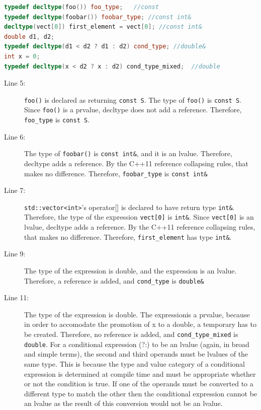 \documentclass[a4paper,11pt,twoside]{book}
\begin{document}
\begin{itemize}
\begin{lstlisting}[frame=single, language=c++]
typedef decltype(foo()) foo_type;   //const
typedef decltype(foobar()) foobar_type; //const int&
decltype(vect[0]) first_element = vect[0]; //const int&
double d1, d2;
typedef decltype(d1 < d2 ? d1 : d2) cond_type; //double&
int x = 0;
typedef decltype(x < d2 ? x : d2) cond_type_mixed;  //double
\end{lstlisting}

	\begin{description}
		\item[Line 5:] \texttt{foo()} is declared as returning \texttt{const S}. The type of \texttt{foo()}
is \texttt{const S}. Since \texttt{foo()} is a prvalue, decltype does not add a reference. Therefore, \texttt{foo\_type} is \texttt{const S}.
		
		\item[Line 6:] The type of \texttt{foobar()} is \texttt{const int\&}, and it is an lvalue. Therefore, decltype adds a reference. By the C++11 reference collapsing rules, that makes no difference. Therefore, \texttt{foobar\_type} is \texttt{const int\&}
		
		\item[Line 7:] \texttt{std::vector<int>}'s operator[] is declared to have return type \texttt{int\&}. Therefore, the type of the expression \texttt{vect[0]} is \texttt{int\&}. Since \texttt{vect[0]} is an lvalue, decltype adds a reference. By the C++11 reference collapsing rules, that makes no difference. Therefore, \texttt{first\_element} has type \texttt{int\&}.  
		
		\item[Line 9:]  The type of the expression is double, and the expression is an lvalue. Therefore, a reference is added, and \texttt{cond\_type} is \texttt{double\&}
		
		\item[Line 11:] The type of the expression is double. The expressionis a prvalue, because in order to accomodate the promotion of x to a double, a temporary has to be created. Therefore, no reference is added, and \texttt{cond\_type\_mixed} is \texttt{double}.  For a conditional expression (?:) to be an lvalue (again, in broad and simple terms), the second and third operands must be lvalues of the same type. This is because the type and value category of a conditional expression is determined at compile time and must be appropriate whether or not the condition is true. If one of the operands must be converted to a different type to match the other then the conditional expression cannot be an lvalue as the result of this conversion would not be an lvalue.
	\end{description}

\end{itemize}
\end{document}
